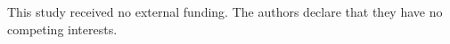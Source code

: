 \documentclass[10pt,letterpaper]{article}
\begin{document}
This study received no external funding. The authors declare that they have no competing interests.

                                                                                                                                                                          

                                                                                                                                                                          
\end{document}
